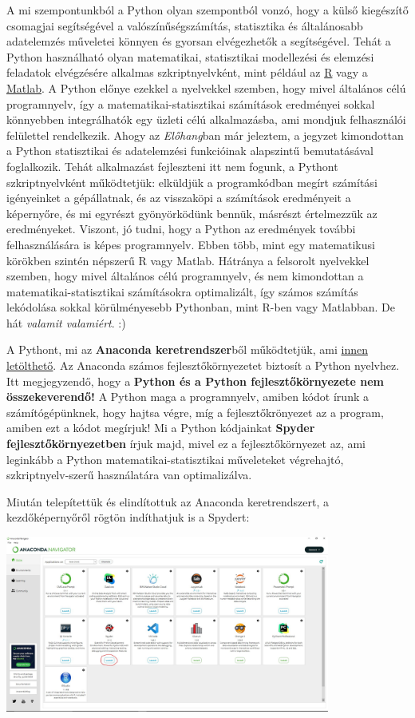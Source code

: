 \documentclass[
]{book}
\begin{document}
A mi szempontunkból a Python olyan szempontból vonzó, hogy a külső kiegészítő csomagjai segítségével a valószínűségszámítás, statisztika és általánosabb adatelemzés műveletei könnyen és gyorsan elvégezhetők a segítségével. Tehát a Python használható olyan matematikai, statisztikai modellezési és elemzési feladatok elvégzésére alkalmas szkriptnyelvként, mint például az \href{https://cran.r-project.org/}{R} vagy a \href{https://www.mathworks.com/products/matlab.html}{Matlab}. A Python előnye ezekkel a nyelvekkel szemben, hogy mivel általános célú programnyelv, így a matematikai-statisztikai számítások eredményei sokkal könnyebben integrálhatók egy üzleti célú alkalmazásba, ami mondjuk felhasználói felülettel rendelkezik.
Ahogy az \emph{Előhang}ban már jeleztem, a jegyzet kimondottan a Python statisztikai és adatelemzési funkcióinak alapszintű bemutatásával foglalkozik. Tehát alkalmazást fejleszteni itt nem fogunk, a Pythont szkriptnyelvként működtetjük: elküldjük a programkódban megírt számítási igényeinket a gépállatnak, és az visszaköpi a számítások eredményeit a képernyőre, és mi egyrészt gyönyörködünk bennük, másrészt értelmezzük az eredményeket. Viszont, jó tudni, hogy a Python az eredmények további felhasználására is képes programnyelv. Ebben több, mint egy matematikusi körökben szintén népszerű R vagy Matlab. Hátránya a felsorolt nyelvekkel szemben, hogy mivel általános célú programnyelv, és nem kimondottan a matematikai-statisztikai számításokra optimalizált, így számos számítás lekódolása sokkal körülményesebb Pythonban, mint R-ben vagy Matlabban. De hát \emph{valamit valamiért}. :)

A Pythont, mi az \textbf{Anaconda keretrendszer}ből működtetjük, ami \href{https://www.anaconda.com/products/distribution}{innen letölthető}. Az Anaconda számos fejlesztőkörnyezetet biztosít a Python nyelvhez. Itt megjegyzendő, hogy a \textbf{Python és a Python fejlesztőkörnyezete nem összekeverendő!} A Python maga a programnyelv, amiben kódot írunk a számítógépünknek, hogy hajtsa végre, míg a fejlesztőkrönyezet az a program, amiben ezt a kódot megírjuk!
Mi a Python kódjainkat \textbf{Spyder fejlesztőkörnyezetben} írjuk majd, mivel ez a fejlesztőkörnyezet az, ami leginkább a Python matematikai-statisztikai műveleteket végrehajtó, szkriptnyelv-szerű használatára van optimalizálva.

Miután telepítettük és elindítottuk az Anaconda keretrendszert, a kezdőképernyőről rögtön indíthatjuk is a Spydert:

\includegraphics[width=0.8\textwidth,height=\textheight]{Anaconda.jpg}
\end{document}
